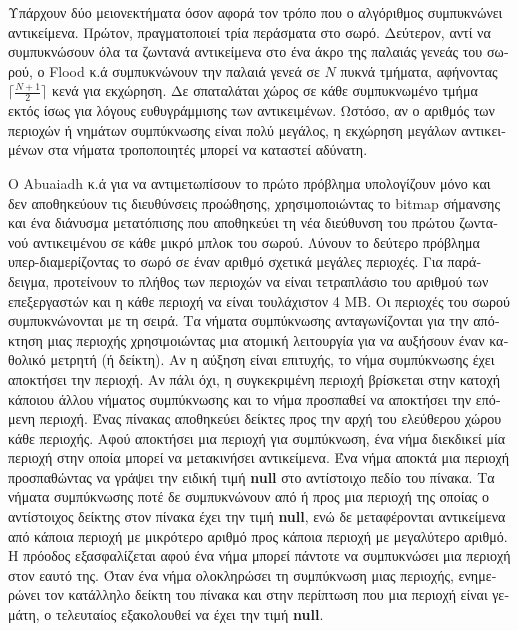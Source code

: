 \begin{greek}
Υπάρχουν δύο μειονεκτήματα όσον αφορά τον τρόπο που ο αλγόριθμος
συμπυκνώνει αντικείμενα. Πρώτον, πραγματοποιεί τρία περάσματα
στο σωρό. Δεύτερον, αντί να συμπυκνώσουν όλα τα ζωντανά αντικείμενα
στο ένα άκρο της παλαιάς γενεάς του σωρού, ο Flood κ.ά συμπυκνώνουν
την παλαιά γενεά σε $N$ πυκνά τμήματα, αφήνοντας $\lceil{\frac{N+1}{2}}\rceil$
κενά για εκχώρηση. Δε σπαταλάται χώρος σε κάθε συμπυκνωμένο τμήμα
εκτός ίσως για λόγους ευθυγράμμισης των αντικειμένων. Ωστόσο, αν
ο αριθμός των περιοχών ή νημάτων συμπύκνωσης είναι πολύ μεγάλος,
η εκχώρηση μεγάλων αντικειμένων στα νήματα τροποποιητές μπορεί
να καταστεί αδύνατη.

Ο Abuaiadh κ.ά \cite{DBLP:conf/oopsla/AbuaiadhOPS04} για να αντιμετωπίσουν
το πρώτο πρόβλημα υπολογίζουν μόνο και δεν αποθηκεύουν τις διευθύνσεις
προώθησης, χρησιμοποιώντας το bitmap σήμανσης και ένα διάνυσμα
μετατόπισης που αποθηκεύει τη νέα διεύθυνση του πρώτου ζωντανού
αντικειμένου σε κάθε μικρό μπλοκ του σωρού. Λύνουν το δεύτερο πρόβλημα
υπερ-διαμερίζοντας το σωρό σε έναν αριθμό σχετικά μεγάλες περιοχές.
Για παράδειγμα, προτείνουν το πλήθος των περιοχών να είναι τετραπλάσιο
του αριθμού των επεξεργαστών και η κάθε περιοχή να είναι τουλάχιστον
4 MB. Οι περιοχές του σωρού συμπυκνώνονται με τη σειρά. Tα νήματα
συμπύκνωσης ανταγωνίζονται για την απόκτηση μιας περιοχής χρησιμοιώντας
μια ατομική λειτουργία για να αυξήσουν έναν καθολικό μετρητή (ή
δείκτη). Αν η αύξηση είναι επιτυχής, το νήμα συμπύκνωσης έχει
αποκτήσει την περιοχή. Αν πάλι όχι, η συγκεκριμένη περιοχή βρίσκεται
στην κατοχή κάποιου άλλου νήματος συμπύκνωσης και το νήμα προσπαθεί
να αποκτήσει την επόμενη περιοχή. Ένας πίνακας αποθηκεύει δείκτες
προς την αρχή του ελεύθερου χώρου κάθε περιοχής. Αφού αποκτήσει
μια περιοχή για συμπύκνωση, ένα νήμα διεκδικεί μία περιοχή στην
οποία μπορεί να μετακινήσει αντικείμενα. Ένα νήμα αποκτά μια
περιοχή προσπαθώντας να γράψει την ειδική τιμή \textbf{null}
στο αντίστοιχο πεδίο του πίνακα. Τα νήματα συμπύκνωσης ποτέ δε
συμπυκνώνουν από ή προς μια περιοχή της οποίας ο αντίστοιχος
δείκτης στον πίνακα έχει την τιμή \textbf{null}, ενώ δε μεταφέρονται
αντικείμενα από κάποια περιοχή με μικρότερο αριθμό προς κάποια
περιοχή με μεγαλύτερο αριθμό. Η πρόοδος εξασφαλίζεται αφού ένα
νήμα μπορεί πάντοτε να συμπυκνώσει μια περιοχή στον εαυτό της.
Όταν ένα νήμα ολοκληρώσει τη συμπύκνωση μιας περιοχής, ενημερώνει
τον κατάλληλο δείκτη του πίνακα και στην περίπτωση που μια περιοχή
είναι γεμάτη, ο τελευταίος εξακολουθεί να έχει την τιμή \textbf{null}.


\end{greek}
